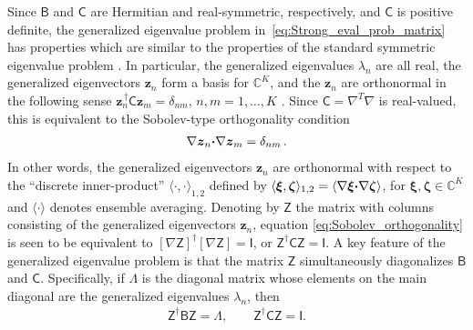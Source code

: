 \documentclass[english,12pt,jmp,graphicx]{revtex4-1}
\newcommand{\vecxi}{\boldsymbol{\xi}}
\newcommand{\veczeta}{\boldsymbol{\zeta}}
\newcommand{\vecz}{\boldsymbol{z}}
\newcommand{\bcdot}{\mbox{\boldmath${\cdot}$}}
\newcommand{\Bm}{\mathsf{B}}
\newcommand{\Cm}{\mathsf{C}}
\newcommand{\Zm}{\mathsf{Z}}
\newcommand{\Ib}{\mathsf{I}}
\begin{document}
Since $\Bm$ and $\Cm$ are Hermitian and real-symmetric, respectively,
and $\Cm$ is 
positive definite, the generalized eigenvalue problem
in~\eqref{eq:Strong_eval_prob_matrix} has properties  
which are similar to the properties of the standard symmetric
eigenvalue problem \cite{Parlett:1980}. In particular, the generalized 
eigenvalues $\lambda_n$ are all real, the generalized eigenvectors
$\vecz_n$ form a basis for $\mathbb{C}^K$, and the $\vecz_n$ are
orthonormal in the following sense $\vecz_n^{\,\dagger}\Cm\vecz_m=\delta_{nm}$,
$n,m=1,\ldots,K$ \cite{Parlett:1980}. Since $\Cm=\nabla^T\nabla$ is
real-valued, this is equivalent to the Sobolev-type orthogonality
condition   
%
\begin{align}\label{eq:Sobolev_orthogonality}
  \nabla\vecz_n\bcdot\nabla\vecz_m=\delta_{nm}\,.  
\end{align}
%
In other words, the generalized eigenvectors $\vecz_n$ are orthonormal
with respect to the ``discrete inner-product'' $\langle\cdot,\cdot\rangle_{1,2}$ defined by
$\langle\vecxi,\veczeta\rangle_{1,2}=\langle \nabla\vecxi\bcdot\nabla\veczeta\rangle$, for 
$\vecxi,\veczeta\in\mathbb{C}^K$ and $\langle\cdot\rangle$ denotes
ensemble averaging. 
Denoting by $\Zm$ the matrix with columns consisting of the generalized
eigenvectors $\vecz_n$, equation \eqref{eq:Sobolev_orthogonality} is
seen to be equivalent to $[\nabla\Zm]^\dagger[\nabla\Zm]=\Ib$, or
$\Zm^\dagger\Cm\Zm=\Ib$. A key feature of the generalized eigenvalue
problem is that the matrix $\Zm$ simultaneously
diagonalizes $\Bm$ and $\Cm$. Specifically, if $\Lambda$ is the diagonal
matrix whose elements on the main diagonal are the generalized
eigenvalues $\lambda_n$, then \cite{Parlett:1980}
% 
\begin{align}\label{eq:Simultaneous_Diag}
  \Zm^\dagger\Bm\Zm=\Lambda, \qquad
  \Zm^\dagger\Cm\Zm=\Ib.
\end{align}
%
\end{document}
